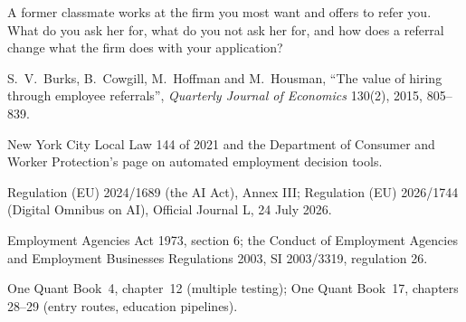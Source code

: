 \begin{interviewq}\label{iq:iv:applications:8}
A former classmate works at the firm you most want and offers to refer you. What do you ask her for, what do
you not ask her for, and how does a referral change what the firm does with your application?
\end{interviewq}

\begin{omsources}
\item S.~V.~Burks, B.~Cowgill, M.~Hoffman and M.~Housman, ``The value of hiring through employee referrals'',
\emph{Quarterly Journal of Economics} 130(2), 2015, 805--839.
\item New York City Local Law 144 of 2021 and the Department of Consumer and Worker Protection's page on
automated employment decision tools.
\item Regulation (EU) 2024/1689 (the AI Act), Annex III; Regulation (EU) 2026/1744 (Digital Omnibus on AI),
Official Journal L, 24 July 2026.
\item Employment Agencies Act 1973, section 6; the Conduct of Employment Agencies and Employment Businesses
Regulations 2003, SI 2003/3319, regulation 26.
\item One Quant Book~4, chapter~12 (multiple testing); One Quant Book~17, chapters 28--29 (entry routes,
education pipelines).
\end{omsources}
